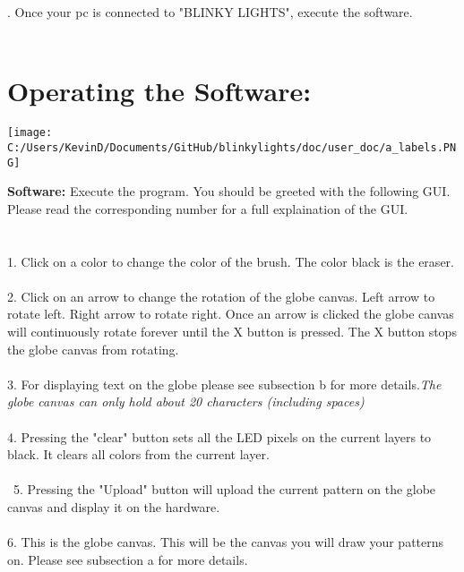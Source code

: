 \documentclass[12pt, a4paper]{ article}
\begin{document}
\vspace{1cm}
. Once your pc is connected to "BLINKY LIGHTS", execute the software.
\\\\










\newpage
{}
\section*{Operating the Software:} 


\indent
\begin{center}
\texttt{[image: C:/Users/KevinD/Documents/GitHub/blinkylights/doc/user\_doc/a\_labels.PNG]}
\end{center}


\noindent
\textbf{Software:} Execute the program. You should be greeted with the following GUI. Please read the corresponding number for a full explaination of the GUI.
\\\\\\
1. Click on a color to change the color of the brush. The color black is the eraser. 
\\\\
2. Click on an arrow to change the rotation of the globe canvas. Left arrow to rotate left. Right arrow to rotate right. Once an arrow is clicked the globe canvas will continuously rotate forever until the X button is pressed. The X button stops the globe canvas from rotating.
\\\\
3. For displaying text on the globe please see subsection b for more details.\textit{The globe canvas can only hold about 20 characters (including spaces)}
\\\\
4. Pressing the "clear" button sets all the LED pixels on the current layers to black. It clears all colors from the current layer.
\\\\\
5. Pressing the "Upload" button will upload the current pattern on the globe canvas and display it on the hardware.
\\\\
6. This is the globe canvas. This will be the canvas you will draw your patterns on. Please see subsection a for more details.
\vspace{5cm}
\end{document}
